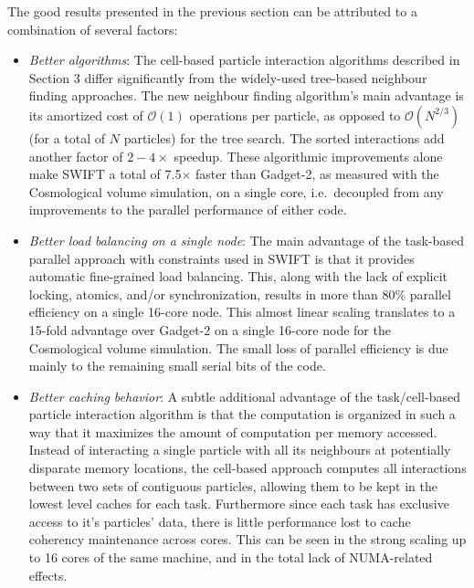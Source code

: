 \documentclass[final]{siamltex}
\newcommand{\oh}[1]
    {\mbox{$ {\mathcal O}( #1 ) $}}
\begin{document}
The good results presented in the previous section can be attributed to
a combination of several factors:

\begin{itemize}

    \item {\em Better algorithms}: The cell-based particle interaction
        algorithms described in Section 3 differ significantly from the
        widely-used tree-based neighbour finding approaches.
        The new neighbour finding algorithm's main advantage is
        its amortized cost of \oh{1} operations per particle,
        as opposed to \oh{N^{2/3}} (for a total of $N$ particles)
        for the tree search.
        The sorted interactions add another factor of $2-4\times$ speedup.
        These algorithmic improvements alone make SWIFT a total
        of 7.5$\times$ faster than Gadget-2, as measured with the
        Cosmological volume simulation, on a single core, i.e.~decoupled
        from any improvements to the parallel performance of either code.
        
    \item {\em Better load balancing on a single node}: The main advantage
        of the task-based parallel approach with constraints
        used in SWIFT is that it
        provides automatic fine-grained load balancing.
        This, along with the
        lack of explicit locking, atomics, and/or synchronization,
        results in more than 80\% parallel efficiency
        on a single 16-core node.
        This almost linear scaling translates to a 15-fold advantage
        over Gadget-2 on a single 16-core node for the Cosmological
        volume simulation.
        The small loss of parallel efficiency is due mainly to the remaining
        small serial bits of the code.
        
    \item {\em Better caching behavior}: A subtle additional advantage of
        the task/cell-based particle interaction algorithm is that
        the computation is organized in such a way that it maximizes the
        amount of computation per memory accessed.
        Instead of interacting a single particle with all its neighbours
        at potentially disparate memory locations, the cell-based
        approach computes all interactions between two sets of contiguous
        particles, allowing them to be kept in the lowest level caches
        for each task.
        Furthermore since each task has exclusive access to it's particles'
        data, there is little performance lost to cache coherency maintenance
        across cores.
        This can be seen in the strong scaling up to 16 cores of the same
        machine, and in the total lack of NUMA-related effects.
    

\end{itemize}
\end{document}
